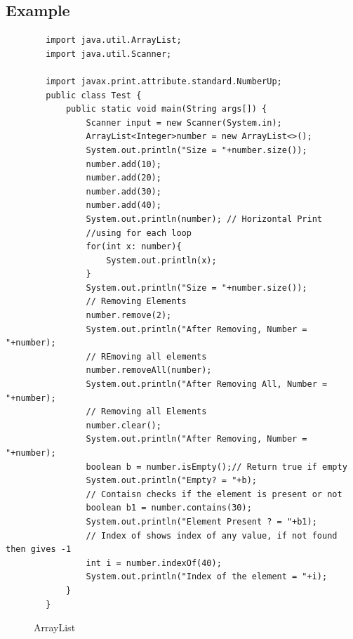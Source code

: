 \documentclass[openany]{book}  %
\begin{document}
\subsection{Example}
\begin{center}
    \begin{verbatim}
        import java.util.ArrayList;
        import java.util.Scanner;

        import javax.print.attribute.standard.NumberUp;
        public class Test {
            public static void main(String args[]) {
                Scanner input = new Scanner(System.in);
                ArrayList<Integer>number = new ArrayList<>();
                System.out.println("Size = "+number.size());
                number.add(10);
                number.add(20);
                number.add(30);
                number.add(40);
                System.out.println(number); // Horizontal Print
                //using for each loop
                for(int x: number){
                    System.out.println(x);
                }
                System.out.println("Size = "+number.size());
                // Removing Elements
                number.remove(2);
                System.out.println("After Removing, Number = "+number);
                // REmoving all elements
                number.removeAll(number);
                System.out.println("After Removing All, Number = "+number);
                // Removing all Elements
                number.clear();
                System.out.println("After Removing, Number = "+number);
                boolean b = number.isEmpty();// Return true if empty
                System.out.println("Empty? = "+b);
                // Contaisn checks if the element is present or not
                boolean b1 = number.contains(30);
                System.out.println("Element Present ? = "+b1);
                // Index of shows index of any value, if not found then gives -1
                int i = number.indexOf(40);
                System.out.println("Index of the element = "+i);                
            }
        }
    \end{verbatim}
\end{center}
% 
% 
\begin{figure}[htbp]
    \begin{center}
        \caption{ArrayList\cite{Ref3}}
    \end{center}
\end{figure}
% 
% 
\end{document}
